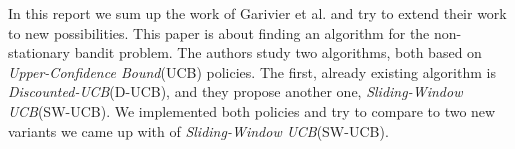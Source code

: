 In this report we sum up the work of Garivier et al. \cite{garivier2008upperconfidence} and try to extend their work to new possibilities. This paper is about finding an algorithm for the non-stationary bandit problem. The authors study two algorithms, both based on \textit{Upper-Confidence Bound}(UCB) policies. The first, already existing algorithm is \textit{Discounted-UCB}(D-UCB), and they propose another one, \textit{Sliding-Window UCB}(SW-UCB). We implemented both policies and try to compare to two new variants we came up with of \textit{Sliding-Window UCB}(SW-UCB).